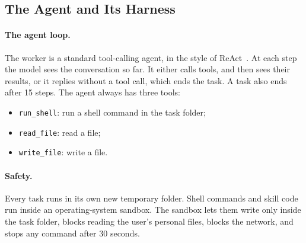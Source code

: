\subsection{The Agent and Its Harness}
\label{sec:agent}

\paragraph{The agent loop.}
The worker is a standard tool-calling agent, in the style of ReAct~\cite{yao2023react}. At each
step the model sees the conversation so far. It either calls tools, and then sees their results, or
it replies without a tool call, which ends the task. A task also ends after 15 steps. The agent
always has three tools:
\begin{itemize}
  \item \texttt{run\_shell}: run a shell command in the task folder;
  \item \texttt{read\_file}: read a file;
  \item \texttt{write\_file}: write a file.
\end{itemize}

\paragraph{Safety.}
Every task runs in its own new temporary folder. Shell commands and skill code run inside an
operating-system sandbox. The sandbox lets them write only inside the task folder, blocks reading
the user's personal files, blocks the network, and stops any command after 30 seconds.


